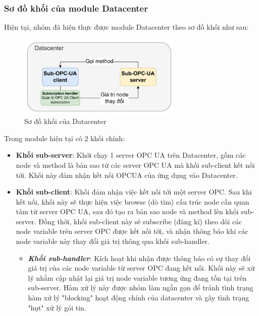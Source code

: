 \subsubsection{Sơ đồ khối của module Datacenter}

Hiện tại, nhóm đã hiện thực được module Datacenter theo sơ đồ khối như sau:

\begin{figure}[H]
    \centering
    \includegraphics[width=0.7\textwidth]{Images/Implementation/Datacenter/Datacenter_block.jpg}
    \caption{Sơ đồ khối của Datacenter}
    \label{fig:blocks_Datacenter}
\end{figure}

Trong module hiện tại có 2 khối chính:

\begin{itemize}
    \item \textbf{Khối sub-server}: Khởi chạy 1 server OPC UA trên Datacenter, gồm các node và method là bản sao từ các server OPC UA mà khối sub-client kết nối tới. Khối này đảm nhận kết nối OPCUA của ứng dụng vào Datacenter.
    \item \textbf{Khối sub-client}: Khối đảm nhận việc kết nối tới một server OPC. Sau khi kết nối, khối này sẽ thực hiện việc browse (dò tìm) cấu trúc node cần quan tâm từ server OPC UA, sau đó tạo ra bản sao node và method lên khối sub-server. Đồng thời, khối sub-client này sẽ subscribe (đăng kí) theo dõi các node variable trên server OPC được kết nối tới, và nhận thông báo khi các node variable này thay đổi giá trị thông qua khối sub-handler.
    \begin{itemize}
        \item \textbf{\textit{Khối sub-handler}}: Kích hoạt khi nhận được thông báo có sự thay đổi giá trị của các node variable từ server OPC đang kết nối. Khối này sẽ xử lý nhằm cập nhật lại giá trị node variable tương ứng đang tồn tại trên sub-server. Hàm xử lý này được nhóm làm ngắn gọn để tránh tình trạng hàm xử lý "blocking" hoạt động chính của datacenter và gây tình trạng "hụt" xử lý gói tin.
    \end{itemize}
\end{itemize}

